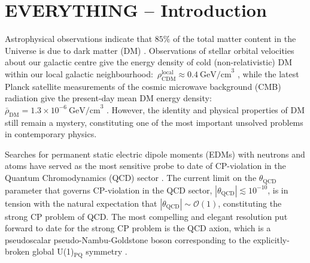 \section{EVERYTHING -- Introduction}
\label{Sec:Introduction}

Astrophysical observations indicate that $85 \%$ of the total matter content in the Universe is due to dark matter (DM) \cite{Planck2015}.
Observations of stellar orbital velocities about our galactic centre give the energy density of cold (non-relativistic) DM within our local galactic neighbourhood:~$\rho_{\textrm{CDM}}^{\textrm{local}} \approx 0.4~\textrm{GeV/cm}^3$ \cite{Catena2010}, while the latest Planck satellite measurements of the cosmic microwave background (CMB) radiation give the present-day mean DM energy density:~$\bar{\rho}_{\textrm{DM}} = 1.3 \times 10^{-6}~\textrm{GeV/cm}^3$ \cite{Planck2015}.
However, the identity and physical properties of DM still remain a mystery, constituting one of the most important unsolved problems in contemporary physics.

Searches for permanent static electric dipole moments (EDMs) with neutrons \cite{Baker2006,Serebrov2014,Pendlebury2015} and atoms \cite{Griffith2009,Heckel2016} have served as the most sensitive probe to date of CP-violation in the Quantum Chromodynamics (QCD) sector \cite{Ginges2004Review,Pospelov2005Review,Engel2013Review,Roberts2015Review}.
The current limit on the $\theta_{\textrm{QCD}}$ parameter that governs CP-violation in the QCD sector, $\left|\theta_{\textrm{QCD}} \right| \lesssim 10^{-10}$, is in tension with the natural expectation that $\left| \theta_{\textrm{QCD}} \right| \sim \mathcal{O}(1)$, constituting the strong CP problem of QCD.
The most compelling and elegant resolution put forward to date for the strong CP problem is the QCD axion, which is a pseudoscalar pseudo-Nambu-Goldstone boson corresponding to the explicitly-broken global U(1)$_{\textrm{PQ}}$ symmetry \cite{PQ1977A,Weinberg1978,Wilczek1978,Kim1979,Zakharov1980,Zhitnitsky1980,Srednicki1981}.

